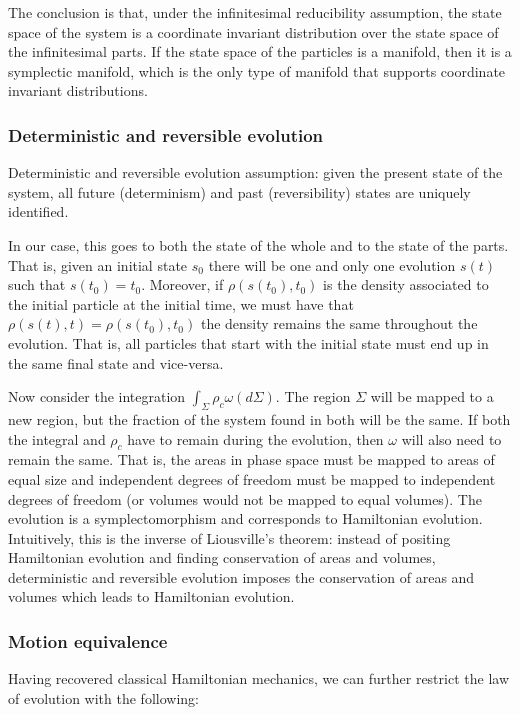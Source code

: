 \documentclass[letterpaper]{article}
\begin{document}
The conclusion is that, under the infinitesimal reducibility assumption, the state space of the system is a coordinate invariant distribution over the state space of the infinitesimal parts. If the state space of the particles is a manifold, then it is a symplectic manifold, which is the only type of manifold that supports coordinate invariant distributions.

\subsubsection{Deterministic and reversible evolution}

Deterministic and reversible evolution assumption: given the present state of the system, all future (determinism) and past (reversibility) states are uniquely identified.

In our case, this goes to both the state of the whole and to the state of the parts. That is, given an initial state $s_0$ there will be one and only one evolution $s(t)$ such that $s(t_0) = t_0$. Moreover, if $\rho(s(t_0), t_0)$ is the density associated to the initial particle at the initial time, we must have that $\rho(s(t), t) = \rho(s(t_0), t_0)$ the density remains the same throughout the evolution. That is, all particles that start with the initial state must end up in the same final state and vice-versa.

Now consider the integration $\int_{\Sigma} \rho_c \omega(d\Sigma)$. The region $\Sigma$ will be mapped to a new region, but the fraction of the system found in both will be the same. If both the integral and $\rho_c$ have to remain during the evolution, then $\omega$ will also need to remain the same. That is, the areas in phase space must be mapped to areas of equal size and independent degrees of freedom must be mapped to independent degrees of freedom (or volumes would not be mapped to equal volumes). The evolution is a symplectomorphism and corresponds to Hamiltonian evolution. Intuitively, this is the inverse of Liousville's theorem: instead of positing Hamiltonian evolution and finding conservation of areas and volumes, deterministic and reversible evolution imposes the conservation of areas and volumes which leads to Hamiltonian evolution.


\subsubsection{Motion equivalence}

Having recovered classical Hamiltonian mechanics, we can further restrict the law of evolution with the following:
\end{document}
